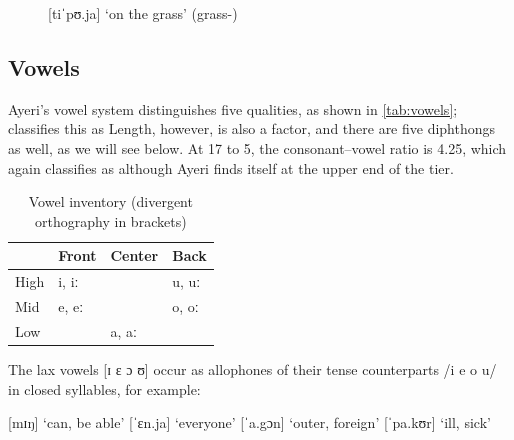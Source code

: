 \begin{figure}[h]
\ex\label{ex:diphya}
	 [tiˈpʊ.ja] `on the grass' 
		(grass-\Loc{})
\xe
\end{figure}

%
%

\subsection{Vowels}
\label{subsec:vowels}

%

Ayeri's vowel system distinguishes five qualities, as shown in
\autoref{tab:vowels}; \citet{wals2} classifies this as 
Length, however, is also a factor, and there are five diphthongs as well, as we
will see below. At 17 to 5, the consonant--vowel ratio is 4.25, which
\citet{wals3} again classifies as  although Ayeri finds
itself at the upper end of the tier.

\begin{table}\centering
\caption[Vowel inventory]{Vowel inventory (divergent orthography in brackets)}
\begin{tabu} to .67\linewidth{B[1] X[2c] X[2c] X[2c]}
\toprule\tableheaderfont

	& Front
	& Center
	& Back
	\\

\toprule

High
	& i, iː 
	&
	& u, uː 
	\\
	\midrule

Mid
	& e, eː 
	&
	& o, oː 
	\\
	\midrule

Low
	&
	& a, aː 
	&
	\\

\bottomrule
\end{tabu}
\label{tab:vowels}
\end{table}

%
The lax vowels [ɪ ɛ ɔ ʊ] occur as allophones of their tense counterparts 
/i e o u/ in closed syllables, for example:

\pex
	\a {} [mɪŋ] `can, be able'
	\a {} [ˈɛn.ja] `everyone'
	\a {} [ˈa.gɔn] `outer, foreign'
	\a {} [ˈpa.kʊr] `ill, sick'
\xe

